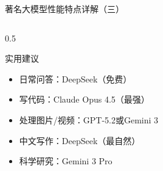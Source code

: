 \documentclass[aspectratio=169,11pt]{beamer}
\begin{document}
\begin{frame}{著名大模型性能特点详解（三）}
\begin{columns}
\begin{column}{0.5\textwidth}
            \vspace{0.2cm}
            \begin{exampleblock}{实用建议}
                \small
                \begin{itemize}
                    \item 日常问答：DeepSeek（免费）
                    \item 写代码：Claude Opus 4.5（最强）
                    \item 处理图片/视频：GPT-5.2或Gemini 3
                    \item 中文写作：DeepSeek（最自然）
                    \item 科学研究：Gemini 3 Pro
                \end{itemize}
            \end{exampleblock}
        \end{column}
    \end{columns}
\end{frame}
\end{document}
